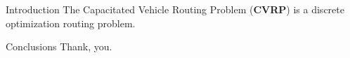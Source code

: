 \begin{frame}
	\maketitle
\end{frame}

\begin{frame}{Introduction}
	The Capacitated Vehicle Routing Problem (\textbf{CVRP}) is a discrete optimization routing problem.

\end{frame}

\begin{frame}{Conclusions}
	Thank, you.

	\cite{jepsen2014}
\end{frame}

\begin{frame}
	\maketitle
\end{frame}
